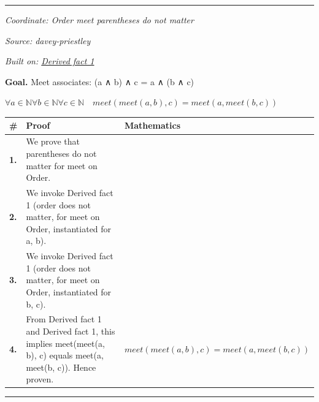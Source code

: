 \documentclass[11pt]{article}
\theoremstyle{definition}
\begin{document}
\label{thm:Order-join-order_does_not_matter}
\par\medskip\hrule
\bigskip
{}\par
\smallskip\noindent\textit{Coordinate: Order \cdot meet \cdot parentheses do not matter}\par
\smallskip\noindent\textit{Source: davey-priestley}\par
\smallskip\noindent\textit{Built on: \hyperref[thm:Order-meet-order_does_not_matter]{Derived fact 1}}\par
\medskip
\noindent\textbf{Goal.} Meet associates: (a ∧ b) ∧ c = a ∧ (b ∧ c)\par
\noindent$\displaystyle \forall a \in \mathbb{N} \forall b \in \mathbb{N} \forall c \in \mathbb{N}\quad meet(meet(a, b), c) = meet(a, meet(b, c))$\par
\medskip
\noindent
\begin{tabular}{@{} >{\raggedright\arraybackslash}p{} >{\raggedright\arraybackslash}p{} >{\raggedleft\arraybackslash}p{} @{}}
\textbf{\#} & \textbf{Proof} & \textbf{Mathematics} \\
\midrule
\textbf{1.} & We prove that parentheses do not matter for meet on Order. & \\[0.45em]
\textbf{2.} & We invoke Derived fact 1 (order does not matter, for meet on Order, instantiated for a, b). & \\[0.45em]
\textbf{3.} & We invoke Derived fact 1 (order does not matter, for meet on Order, instantiated for b, c). & \\[0.45em]
\textbf{4.} & From Derived fact 1 and Derived fact 1, this implies meet(meet(a, b), c) equals meet(a, meet(b, c)). Hence proven. & $\displaystyle meet(meet(a, b), c) = meet(a, meet(b, c))$ \\[0.45em]
\bottomrule
\end{tabular}
\label{thm:Order-meet-parentheses_do_not_matter}
\par\medskip\hrule
\end{document}
